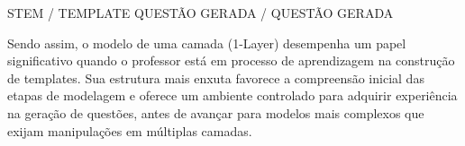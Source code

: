 STEM / TEMPLATE
QUESTÃO GERADA / QUESTÃO GERADA

Sendo assim, o modelo de uma camada (1-Layer) desempenha um papel significativo quando o professor está em processo de aprendizagem na construção de templates. Sua estrutura mais enxuta favorece a compreensão inicial das etapas de modelagem e oferece um ambiente controlado para adquirir experiência na geração de questões, antes de avançar para modelos mais complexos que exijam manipulações em múltiplas camadas.
